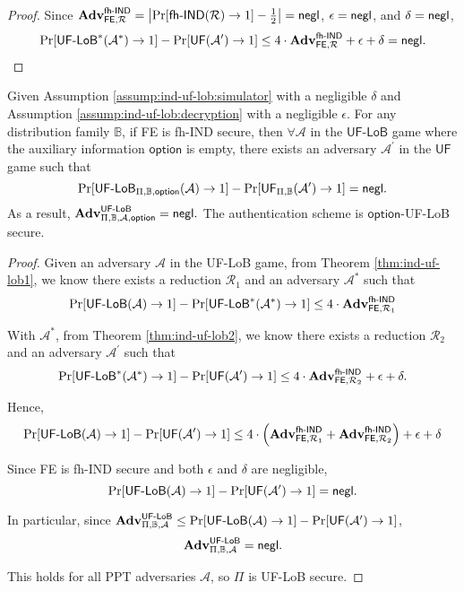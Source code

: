 \begin{proof}
\noindent Since $\mathbf{Adv}_{\textsf{FE}, \mathcal{R}}^\textsf{fh-IND} = \left| \Pr[\textsf{fh-IND}(\mathcal{R}) \to 1] - \frac{1}{2} \right| = \mathsf{negl}$, $\epsilon = \mathsf{negl}$, and $\delta = \mathsf{negl}$,
\[
	\Pr[\textsf{UF-LoB}^*(\mathcal{A}^*) \to 1] - \Pr[\textsf{UF}(\mathcal{A}^\prime) \to 1] \leq 4 \cdot \mathbf{Adv}_{\textsf{FE}, \mathcal{R}}^\textsf{fh-IND} + \epsilon + \delta = \mathsf{negl}.
\]

\end{proof}

\begin{corollary}
Given Assumption \ref{assump:ind-uf-lob:simulator} with a negligible $\delta$ and Assumption \ref{assump:ind-uf-lob:decryption} with a negligible $\epsilon$.
	For any distribution family $\mathbb{B}$, if \textsf{FE} is fh-IND secure, then $\forall \mathcal{A}$ in the $\textsf{UF-LoB}$ game where the auxiliary information $\textsf{option}$ is empty, there exists an adversary $\mathcal{A}^\prime$ in the $\textsf{UF}$ game such that
\[
	\Pr[\textsf{UF-LoB}_{\Pi, \mathbb{B}, \textsf{option}}(\mathcal{A}) \to 1] - \Pr[\textsf{UF}_{\Pi, \mathbb{B}}(\mathcal{A}^\prime) \to 1] = \mathsf{negl}.
\]
As a result, $\mathbf{Adv}_{\Pi, \mathbb{B}, \mathcal{A}, \textsf{option}}^{\textsf{UF-LoB}} = \mathsf{negl}.$ The authentication scheme is $\textsf{option}$-UF-LoB secure.	

\end{corollary}

\begin{proof}

Given an adversary $\mathcal{A}$ in the \textsf{UF-LoB} game, from Theorem \ref{thm:ind-uf-lob1}, we know there exists a reduction $\mathcal{R}_1$ and an adversary $\mathcal{A}^*$ such that
\[
	\Pr[\textsf{UF-LoB}(\mathcal{A}) \to 1] - \Pr[ \textsf{UF-LoB}^*(\mathcal{A}^*) \to 1 ] \leq 4 \cdot \mathbf{Adv}_{\textsf{FE}, \mathcal{R}_1}^\textsf{fh-IND}
\]

With $\mathcal{A}^*$, from Theorem \ref{thm:ind-uf-lob2}, we know there exists a reduction $\mathcal{R}_2$ and an adversary $\mathcal{A}^\prime$ such that 
\[
	\Pr[\textsf{UF-LoB}^*(\mathcal{A}^*) \to 1] - \Pr[\textsf{UF}(\mathcal{A}^\prime) \to 1] \leq 4 \cdot \mathbf{Adv}_{\textsf{FE}, \mathcal{R}_2}^\textsf{fh-IND} + \epsilon + \delta.
\]

Hence,
\[
	\Pr[\textsf{UF-LoB}(\mathcal{A}) \to 1] - \Pr[\textsf{UF}(\mathcal{A}^\prime) \to 1] \leq 4 \cdot \left( \mathbf{Adv}_{\textsf{FE}, \mathcal{R}_1}^\textsf{fh-IND} + \mathbf{Adv}_{\textsf{FE}, \mathcal{R}_2}^\textsf{fh-IND} \right) + \epsilon + \delta
\]

Since \textsf{FE} is \textsf{fh-IND} secure and both $\epsilon$ and $\delta$ are negligible,
\[
	\Pr[\textsf{UF-LoB}(\mathcal{A}) \to 1] - \Pr[\textsf{UF}(\mathcal{A}^\prime) \to 1] = \mathsf{negl}.
\]

\noindent In particular, since $\mathbf{Adv}_{\Pi, \mathbb{B}, \mathcal{A}}^{\textsf{UF-LoB}} \leq \Pr[\textsf{UF-LoB}(\mathcal{A}) \to 1] - \Pr[\textsf{UF}(\mathcal{A}^\prime) \to 1]$,
\[
	\mathbf{Adv}_{\Pi, \mathbb{B}, \mathcal{A}}^{\textsf{UF-LoB}} = \mathsf{negl}.
\]

\noindent This holds for all PPT adversaries $\mathcal{A}$, so $\Pi$ is UF-LoB secure.

\end{proof}


